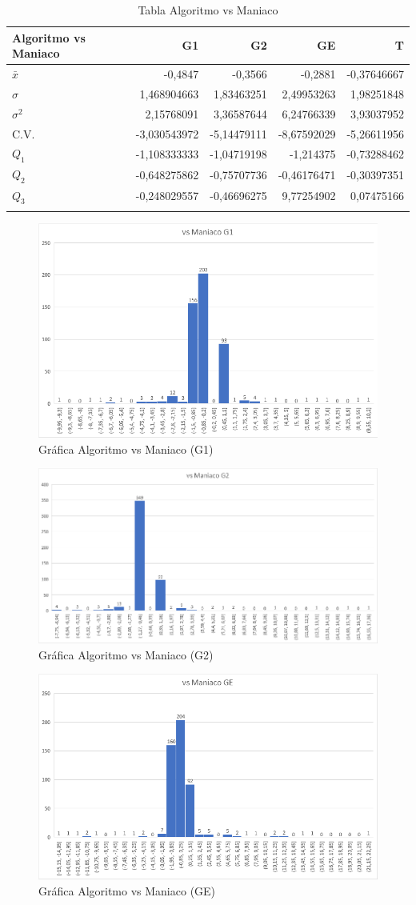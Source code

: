 \begin{longtable}[c]{lrrrr}
\hline
Algoritmo vs Maniaco & G1 & G2 & GE & T \\ \hline
$\bar{x}$ & -0,4847 & -0,3566 & -0,2881 & -0,37646667 \\ 
$\sigma$ & 1,468904663 & 1,83463251 & 2,49953263 & 1,98251848 \\ 
$\sigma^2$  & 2,15768091 & 3,36587644 & 6,24766339 & 3,93037952 \\ 
C.V. & -3,030543972 & -5,14479111 & -8,67592029 & -5,26611956 \\ 
$Q_1$ & -1,108333333 & -1,04719198 & -1,214375 & -0,73288462 \\
$Q_2$ & -0,648275862 & -0,75707736 & -0,46176471 & -0,30397351 \\ 
$Q_3$ & -0,248029557 & -0,46696275 & 9,77254902 & 0,07475166 \\ \hline
\caption{Tabla Algoritmo vs Maniaco}
\label{tab:AvM}
\end{longtable}


\begin{figure}[h]
\centering
\includegraphics[width=.6\textwidth]{figuras/AvMG1.png}   
\caption{Gráfica Algoritmo vs Maniaco (G1)}
\label{fig:AvMG1}
\end{figure}

\begin{figure}[h]
\centering
\includegraphics[width=.6\textwidth]{figuras/AvMG2.png}   
\caption{Gráfica Algoritmo vs Maniaco (G2)}
\label{fig:AvMG2}
\end{figure}


\begin{figure}[h]
\centering
\includegraphics[width=.6\textwidth]{figuras/AvMGE.png}   
\caption{Gráfica Algoritmo vs Maniaco (GE)}
\label{fig:AvMGE}
\end{figure}

